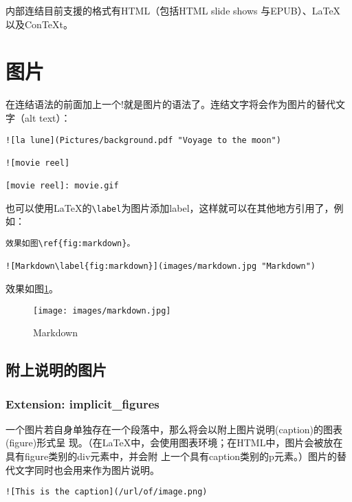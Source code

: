 \documentclass[fancyhdr,bookmark]{ctexbook}
\begin{document}
内部连结目前支援的格式有HTML（包括HTML slide shows 与EPUB）、LaTeX
以及ConTeXt。

\section{图片}\label{ux56feux7247}

在连结语法的前面加上一个!就是图片的语法了。连结文字将会作为图片的替代文字（alt
text）：

\begin{lstlisting}
![la lune](Pictures/background.pdf "Voyage to the moon")

![movie reel]

[movie reel]: movie.gif
\end{lstlisting}

也可以使用LaTeX的\lstinline!\label!为图片添加label，这样就可以在其他地方引用了，例如：

\begin{lstlisting}
效果如图\ref{fig:markdown}。

![Markdown\label{fig:markdown}](images/markdown.jpg "Markdown")
\end{lstlisting}

效果如图\ref{fig:markdown}。

\begin{figure}[htbp]
\centering
\texttt{[image: images/markdown.jpg]}
\caption{Markdown\label{fig:markdown}}
\end{figure}

\subsection{附上说明的图片}\label{ux9644ux4e0aux8bf4ux660eux7684ux56feux7247}

\subsubsection{Extension:
implicit\_figures}\label{extension-implicitux5ffigures}

一个图片若自身单独存在一个段落中，那么将会以附上图片说明(caption)的图表(figure)形式呈
现。（在LaTeX中，会使用图表环境；在HTML中，图片会被放在具有figure类别的div元素中，并会附
上一个具有caption类别的p元素。）图片的替代文字同时也会用来作为图片说明。

\begin{lstlisting}
![This is the caption](/url/of/image.png)
\end{lstlisting}
\end{document}
